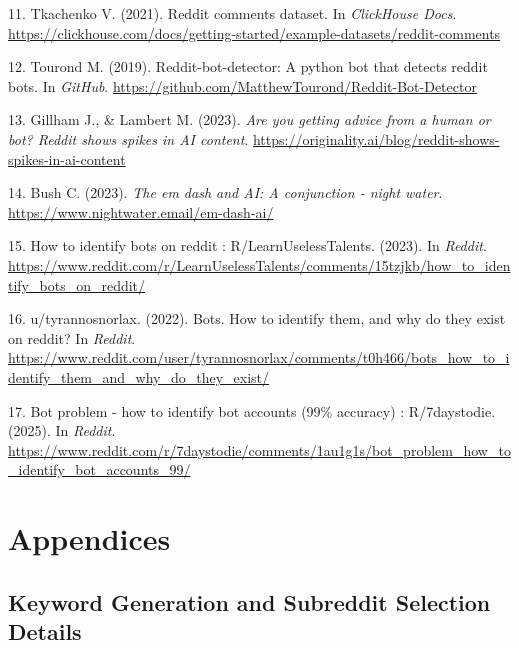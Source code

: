 \documentclass[
  12pt,
  letterpaper,
  DIV=11,
  numbers=noendperiod]{scrartcl}
\newlength{\cslhangindent}
\newenvironment{CSLReferences}[2] %
 {\begin{list}{}{%
  \setlength{\itemindent}{0pt}
  \setlength{\leftmargin}{0pt}
  \setlength{\parsep}{0pt}
  \ifodd #1
   \setlength{\leftmargin}{\cslhangindent}
   \setlength{\itemindent}{-1\cslhangindent}
  \fi
  \setlength{\itemsep}{#2\baselineskip}}}
 {\end{list}}
\begin{document}
\begin{CSLReferences}{1}{0}
11. Tkachenko V. (2021). Reddit comments dataset. In \emph{ClickHouse
Docs}.
\url{https://clickhouse.com/docs/getting-started/example-datasets/reddit-comments}

12. Tourond M. (2019). Reddit-bot-detector: A python bot that detects
reddit bots. In \emph{GitHub}.
\url{https://github.com/MatthewTourond/Reddit-Bot-Detector}

13. Gillham J., \& Lambert M. (2023). \emph{Are you getting advice from
a human or bot? Reddit shows spikes in AI content}.
\url{https://originality.ai/blog/reddit-shows-spikes-in-ai-content}

14. Bush C. (2023). \emph{The em dash and AI: A conjunction - night
water}. \url{https://www.nightwater.email/em-dash-ai/}

15. How to identify bots on reddit : R/LearnUselessTalents. (2023). In
\emph{Reddit}.
\url{https://www.reddit.com/r/LearnUselessTalents/comments/15tzjkb/how_to_identify_bots_on_reddit/}

16. u/tyrannosnorlax. (2022). Bots. How to identify them, and why do
they exist on reddit? In \emph{Reddit}.
\url{https://www.reddit.com/user/tyrannosnorlax/comments/t0h466/bots_how_to_identify_them_and_why_do_they_exist/}

17. Bot problem - how to identify bot accounts (99\% accuracy) :
R/7daystodie. (2025). In \emph{Reddit}.
\url{https://www.reddit.com/r/7daystodie/comments/1au1g1s/bot_problem_how_to_identify_bot_accounts_99/}

\end{CSLReferences}

\newpage

\section*{Appendices}\label{appendices}

\subsection{Keyword Generation and Subreddit Selection
Details}\label{keyword-generation-and-subreddit-selection-details}
\end{document}
